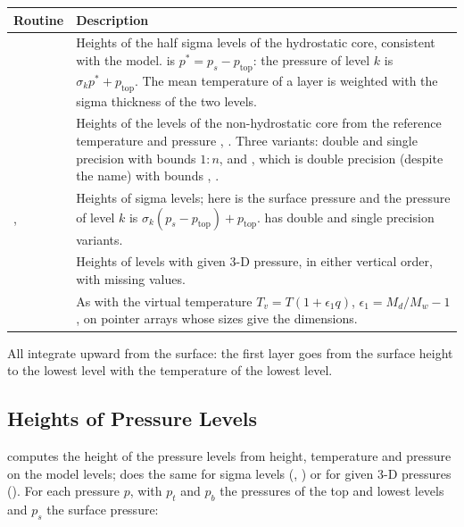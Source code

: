 \begin{longtable}{L{5.5cm} L{8.5cm}}
  \toprule
  \textbf{Routine} & \textbf{Description} \\
  \midrule
  \endhead
  \bottomrule
  \endfoot
   &
    Heights of the half sigma levels of the hydrostatic core, consistent
    with the model.  is $p^* = p_s - p_\text{top}$: the pressure
    of level $k$ is $\sigma_k p^* + p_\text{top}$. The mean temperature of a
    layer is weighted with the sigma thickness of the two levels. \\
   &
    Heights of the levels of the non-hydrostatic core from the reference
    temperature and pressure , . Three variants: double
    and single precision with bounds $1{:}n$, and ,
    which is double precision (despite the name) with bounds
    , . \\
  ,  &
    Heights of sigma levels; here  is the surface pressure and
    the pressure of level $k$ is $\sigma_k(p_s - p_\text{top}) +
    p_\text{top}$.  has double and single precision
    variants. \\
   &
    Heights of levels with given 3-D pressure, in either vertical order,
    with missing values. \\
   &
    As  with the virtual temperature
    $T_v = T(1 + \epsilon_1 q)$, $\epsilon_1 = M_d/M_w - 1$, on pointer
    arrays whose sizes give the dimensions. \\
\end{longtable}

All integrate upward from the surface: the first layer goes from the
surface height to the lowest level with the temperature of the lowest
level.

\subsection{Heights of Pressure Levels}
\label{subsec:hgt_plevels}

 computes the height
 of the  pressure levels  from height, temperature
and pressure on the model levels;  does the same for
sigma levels (, ) or for given 3-D pressures
(). For each pressure $p$, with $p_t$ and $p_b$ the pressures
of the top and lowest levels and $p_s$ the surface pressure:

